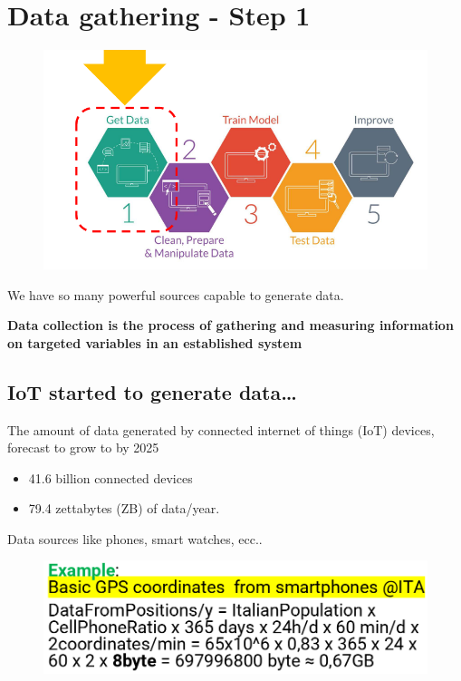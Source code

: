 \documentclass{report}
\begin{document}
\section{Data gathering - Step 1}
\begin{figure}[H]
    \centering
    \includegraphics[width=0.8\linewidth]{images/data ghatering.png}
\end{figure}

\noindent We have so many powerful sources capable to generate data.

\noindent \textbf{Data collection is the process of gathering and measuring information on targeted variables in an established system}

\subsection{IoT started to generate data…}
\noindent The amount of data generated by connected internet of things (IoT) devices, forecast to grow to by 2025
\begin{itemize}
    \item 41.6 billion connected devices
    \item 79.4 zettabytes (ZB) of data/year.
\end{itemize} 

\noindent Data sources like phones, smart watches, ecc..

\begin{figure}[H]
    \centering
    \includegraphics[width=0.8\linewidth]{images/example 1.png}
\end{figure}
\end{document}
